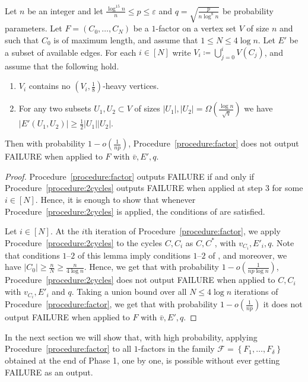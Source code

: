\documentclass{article}
\begin{document}
	\begin{lemma}
		\label{lem:factor}
		Let $n$ be an integer and let $\frac{\log^{15}n}{n} \le p \le \varepsilon$ and $q = \sqrt{\frac{p}{n \log^8 n}}$ be probability parameters.
		Let $F = (C_0, \ldots, C_N)$ be a $1$-factor on a vertex set $V$ of size $n$ and such that $C_0$ is of maximum length, and assume that $1\le N \le 4\log n$.
		Let $E'$ be a subset of available edges.
		For each $i \in [N]$ write $V_i \coloneqq \bigcup_{j=0}^i V(C_j)$,
		and assume that the following hold.
		\begin{enumerate}
			\item $V_i$ contains no $\left(V_i, \tfrac{1}{8} \right)$-heavy vertices.
			\item For any two subsets $U_1, U_2 \subset V$ of sizes $|U_1|, |U_2| = \Omega\left(\frac{\log n}{\sqrt{q}} \right)$ we have $\left|E'(U_1, U_2) \right| \ge \frac{1}{2}|U_1||U_2|$.
		\end{enumerate}
		Then with probability $1 - o\left(\frac{1}{np} \right)$, Procedure~\ref{procedure:factor} does not output FAILURE when applied to $F$ with $\bar{v}, E', q$.
	\end{lemma}
	
	\begin{proof}
		Procedure~\ref{procedure:factor} outputs FAILURE if and only if Procedure~\ref{procedure:2cycles} outputs FAILURE when applied at step $3$ for some $i \in [N]$.
		Hence, it is enough to show that whenever Procedure~\ref{procedure:2cycles} is applied, the conditions of  are satisfied.
		
		Let $i \in [N]$.
		At the $i$th iteration of Procedure~\ref{procedure:factor}, we apply Procedure~\ref{procedure:2cycles} to the cycles $C, C_i$ as $C, C^*$, with $v_{C_i}, E'_i, q$.
		Note that conditions $1$--$2$ of this lemma imply conditions $1$--$2$ of , and moreover, we have $|C_0| \ge \frac{n}{N} \ge \frac{n}{4\log n}$.
		Hence, we get that with probability $1 - o\left(\frac{1}{np\log n} \right)$, Procedure~\ref{procedure:2cycles} does not output FAILURE when applied to $C, C_i$ with $v_{C_i}, E'_i$ and $q$.
		Taking a union bound over all $N \le 4\log n$ iterations of Procedure~\ref{procedure:factor}, we get that with probability $1 - o\left(\frac{1}{np} \right)$ it does not output FAILURE when applied to $F$ with $\bar{v}, E', q$.
	\end{proof}
	
	In the next section we will show that, with high probability, applying Procedure~\ref{procedure:factor} to all $1$-factors in the family $\mathcal F = \left\{F_1, \ldots, F_{\delta} \right\}$ obtained at the end of Phase 1, one by one, is possible without ever getting FAILURE as an output.
	
\end{document}
